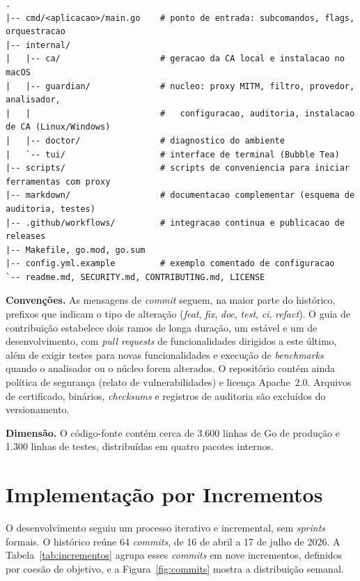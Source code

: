 \begin{lstlisting}[basicstyle=\ttfamily\scriptsize, frame=single, caption={Estrutura do repositório (simplificada)}, label={lst:repo}, captionpos=t, breaklines=true]
.
|-- cmd/<aplicacao>/main.go    # ponto de entrada: subcomandos, flags, orquestracao
|-- internal/
|   |-- ca/                    # geracao da CA local e instalacao no macOS
|   |-- guardian/              # nucleo: proxy MITM, filtro, provedor, analisador,
|   |                          #   configuracao, auditoria, instalacao de CA (Linux/Windows)
|   |-- doctor/                # diagnostico do ambiente
|   `-- tui/                   # interface de terminal (Bubble Tea)
|-- scripts/                   # scripts de conveniencia para iniciar ferramentas com proxy
|-- markdown/                  # documentacao complementar (esquema de auditoria, testes)
|-- .github/workflows/         # integracao continua e publicacao de releases
|-- Makefile, go.mod, go.sum
|-- config.yml.example         # exemplo comentado de configuracao
`-- readme.md, SECURITY.md, CONTRIBUTING.md, LICENSE
\end{lstlisting}

\textbf{Convenções.} As mensagens de \textit{commit} seguem, na maior parte do histórico, prefixos que indicam o tipo de alteração (\textit{feat}, \textit{fix}, \textit{doc}, \textit{test}, \textit{ci}, \textit{refact}). O guia de contribuição estabelece dois ramos de longa duração, um estável e um de desenvolvimento, com \textit{pull requests} de funcionalidades dirigidos a este último, além de exigir testes para novas funcionalidades e execução de \textit{benchmarks} quando o analisador ou o núcleo forem alterados. O repositório contém ainda política de segurança (relato de vulnerabilidades) e licença Apache~2.0. Arquivos de certificado, binários, \textit{checksums} e registros de auditoria são excluídos do versionamento.

\textbf{Dimensão.} O código-fonte contém cerca de 3.600 linhas de Go de produção e 1.300 linhas de testes, distribuídas em quatro pacotes internos.

\section{Implementação por Incrementos}
\label{sec:dev_incrementos}

O desenvolvimento seguiu um processo iterativo e incremental, sem \textit{sprints} formais. O histórico reúne 64 \textit{commits}, de 16 de abril a 17 de julho de 2026. A Tabela~\ref{tab:incrementos} agrupa esses \textit{commits} em nove incrementos, definidos por coesão de objetivo, e a Figura~\ref{fig:commits} mostra a distribuição semanal.

